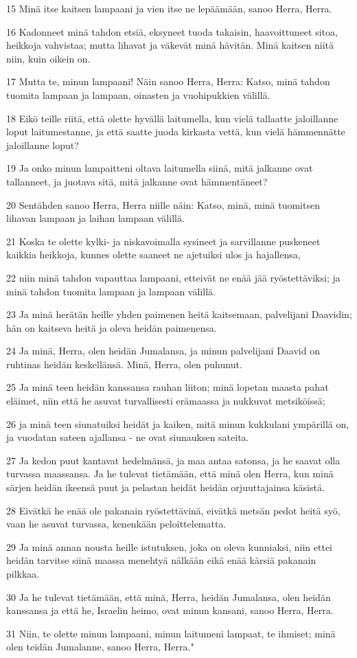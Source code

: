 \par 15 Minä itse kaitsen lampaani ja vien itse ne lepäämään, sanoo Herra, Herra.
\par 16 Kadonneet minä tahdon etsiä, eksyneet tuoda takaisin, haavoittuneet sitoa, heikkoja vahvistaa; mutta lihavat ja väkevät minä hävitän. Minä kaitsen niitä niin, kuin oikein on.
\par 17 Mutta te, minun lampaani! Näin sanoo Herra, Herra: Katso, minä tahdon tuomita lampaan ja lampaan, oinasten ja vuohipukkien välillä.
\par 18 Eikö teille riitä, että olette hyvällä laitumella, kun vielä tallaatte jaloillanne loput laitumestanne, ja että saatte juoda kirkasta vettä, kun vielä hämmennätte jaloillanne loput?
\par 19 Ja onko minun lampaitteni oltava laitumella siinä, mitä jalkanne ovat tallanneet, ja juotava sitä, mitä jalkanne ovat hämmentäneet?
\par 20 Sentähden sanoo Herra, Herra niille näin: Katso, minä, minä tuomitsen lihavan lampaan ja laihan lampaan välillä.
\par 21 Koska te olette kylki- ja niskavoimalla sysineet ja sarvillanne puskeneet kaikkia heikkoja, kunnes olette saaneet ne ajetuiksi ulos ja hajallensa,
\par 22 niin minä tahdon vapauttaa lampaani, etteivät ne enää jää ryöstettäviksi; ja minä tahdon tuomita lampaan ja lampaan välillä.
\par 23 Ja minä herätän heille yhden paimenen heitä kaitsemaan, palvelijani Daavidin; hän on kaitseva heitä ja oleva heidän paimenensa.
\par 24 Ja minä, Herra, olen heidän Jumalansa, ja minun palvelijani Daavid on ruhtinas heidän keskellänsä. Minä, Herra, olen puhunut.
\par 25 Ja minä teen heidän kanssansa rauhan liiton; minä lopetan maasta pahat eläimet, niin että he asuvat turvallisesti erämaassa ja nukkuvat metsiköissä;
\par 26 ja minä teen siunatuiksi heidät ja kaiken, mitä minun kukkulani ympärillä on, ja vuodatan sateen ajallansa - ne ovat siunauksen sateita.
\par 27 Ja kedon puut kantavat hedelmänsä, ja maa antaa satonsa, ja he saavat olla turvassa maassansa. Ja he tulevat tietämään, että minä olen Herra, kun minä särjen heidän ikeensä puut ja pelastan heidät heidän orjuuttajainsa käsistä.
\par 28 Eivätkä he enää ole pakanain ryöstettävinä, eivätkä metsän pedot heitä syö, vaan he asuvat turvassa, kenenkään peloittelematta.
\par 29 Ja minä annan nousta heille istutuksen, joka on oleva kunniaksi, niin ettei heidän tarvitse siinä maassa menehtyä nälkään eikä enää kärsiä pakanain pilkkaa.
\par 30 Ja he tulevat tietämään, että minä, Herra, heidän Jumalansa, olen heidän kanssansa ja että he, Israelin heimo, ovat minun kansani, sanoo Herra, Herra.
\par 31 Niin, te olette minun lampaani, minun laitumeni lampaat, te ihmiset; minä olen teidän Jumalanne, sanoo Herra, Herra."

